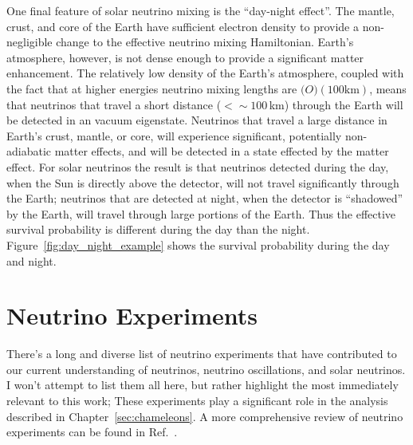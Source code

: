 One final feature of solar neutrino mixing is the ``day-night effect''.
The mantle, crust, and core of the Earth have sufficient electron density to provide
a non-negligible change to the effective neutrino mixing Hamiltonian.
Earth's atmosphere, however, is not dense enough to provide a significant
matter enhancement.
The relatively low density of the Earth's atmosphere, coupled with the fact
that at higher energies neutrino mixing lengths
are $\mathcal(O)(100\mathrm{ km})$, means that neutrinos that travel a short
distance ($<\sim100$\,km) through the Earth will be detected in an
vacuum eigenstate.
Neutrinos that travel a large distance in Earth's crust, mantle, or core,
will experience significant, potentially non-adiabatic matter effects, and will
be detected in a state effected by the matter effect.
For solar neutrinos the result is that neutrinos detected during the day, when
the Sun is directly above the detector, will not travel significantly through
the Earth;
neutrinos that are detected at night, when the detector is ``shadowed'' by the
Earth, will travel through large portions of the Earth.
Thus the effective survival probability is different during the day than the night.
Figure~\ref{fig:day_night_example} shows the survival probability during
the day and night.

\section{Neutrino Experiments}
\label{sec:experiments}
There's a long and diverse list of neutrino experiments that have contributed to
our current understanding of neutrinos, neutrino oscillations, and solar neutrinos.
I won't attempt to list them all here, but rather highlight the most immediately
relevant to this work;
These experiments play a significant role in the analysis described in Chapter~\ref{sec:chameleons}.
A more comprehensive review of neutrino experiments can be found in Ref.~\citep{giuntikim}.

